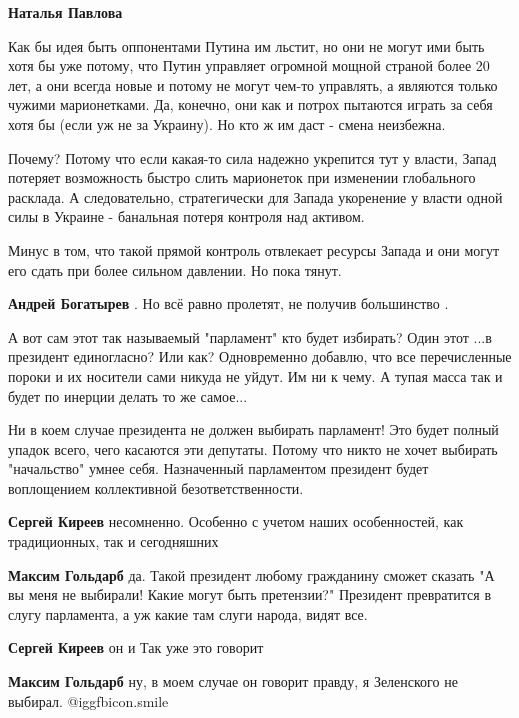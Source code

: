 \begin{itemize}
\begin{itemize}
\textbf{Наталья Павлова} 

Как бы идея быть оппонентами Путина им льстит, но они не могут ими быть хотя бы
уже потому, что Путин управляет огромной мощной страной более 20 лет, а они
всегда новые и потому не могут чем-то управлять, а являются только чужими
марионетками. Да, конечно, они как и потрох пытаются играть за себя хотя бы
(если уж не за Украину). Но кто ж им даст - смена неизбежна.

Почему? Потому что если какая-то сила надежно укрепится тут у власти, Запад
потеряет возможность быстро слить марионеток при изменении глобального
расклада. А следовательно, стратегически для Запада укоренение у власти одной
силы в Украине - банальная потеря контроля над активом.

Минус в том, что такой прямой контроль отвлекает ресурсы Запада и они могут его
сдать при более сильном давлении. Но пока тянут.

\textbf{Андрей Богатырев} .
Но всё равно пролетят, не получив большинство .
\end{itemize} %


А вот сам этот так называемый "парламент" кто будет избирать? Один этот ...в
президент единогласно? Или как? Одновременно добавлю, что все перечисленные
пороки и их носители сами никуда не уйдут. Им ни к чему. А тупая масса так и
будет по инерции делать то же самое...


Ни в коем случае президента не должен выбирать парламент! Это будет полный
упадок всего, чего касаются эти депутаты. Потому что никто не хочет выбирать
"начальство" умнее себя. Назначенный парламентом президент будет воплощением
коллективной безответственности.

\begin{itemize} %
\textbf{Сергей Киреев} несомненно. Особенно с учетом наших особенностей, как традиционных, так и сегодняшних

\textbf{Максим Гольдарб} да. Такой президент любому гражданину сможет сказать "А вы меня не выбирали! Какие могут быть претензии?" Президент превратится в слугу парламента, а уж какие там слуги народа, видят все.

\textbf{Сергей Киреев} он и Так уже это говорит

\textbf{Максим Гольдарб} ну, в моем случае он говорит правду, я Зеленского не выбирал.  @igg{fbicon.smile} 
\end{itemize} %


\end{itemize}
